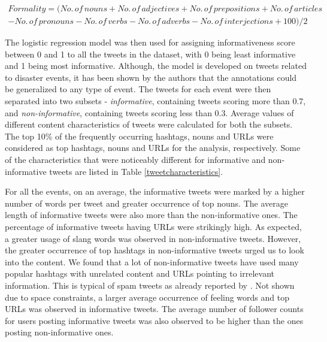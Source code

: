 \begin{align*}
Formality = (No.\, of \, nouns + No.\, of \,adjectives + No. \,of\, prepositions + No.\, of\, articles \\ 
-  No.\, of\, pronouns - No.\, of\, verbs - No.\, of\, adverbs - No.\, of\, interjections + 100)/2
\end{align*}


The logistic regression model was then used for assigning informativeness score between 0 and 1 to all the tweets in the dataset, with 0 being least informative and 1 being most informative. Although, the model is developed on tweets related to disaster events, it has been shown by the 
authors \cite{Imran2013} that the annotations could be generalized to any type of event. The tweets for each event were then separated into two subsets - \textit{informative}, containing
tweets scoring more than 0.7, and \textit{non-informative}, containing tweets scoring less than 0.3. Average values of  different content characteristics of tweets were calculated for both the subsets. The top 10\% of the frequently occurring hashtags, nouns and URLs were considered as top hashtags, nouns and URLs for the analysis, respectively. Some of the characteristics that were noticeably different for informative and
non-informative tweets are listed in Table \ref{tweetcharacteristics}.

For all the events, on an average, the informative tweets were marked by a higher number of words per tweet and greater occurrence of top nouns. The average length of informative tweets were also more than the non-informative ones. The percentage of informative tweets having URLs were strikingly high. As expected, a greater usage of slang words was observed in non-informative tweets. However, the greater occurrence of top hashtags in non-informative tweets urged us to look into the content. We found that a lot of non-informative tweets have used many popular hashtags with unrelated content and URLs pointing to irrelevant information. This is typical of spam tweets as already reported by \cite{yardi2009detecting}. Not shown due to space constraints, a larger average occurrence of feeling words and top URLs was observed in informative tweets. The average number of follower counts for users posting informative tweets was also observed to be higher than the ones posting non-informative ones.

